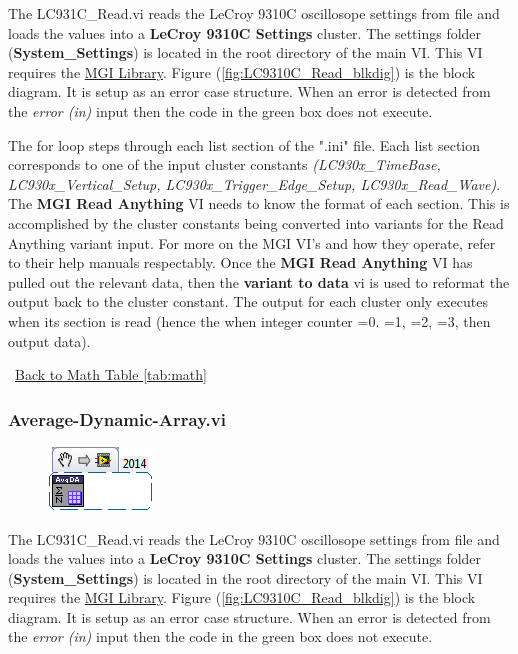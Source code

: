 \documentclass[11pt,a4paper,oldfontcommands]{memoir}
\begin{document}
The LC931C\_Read.vi reads the LeCroy 9310C oscillosope settings from file and loads the values into a \textbf{LeCroy 9310C Settings} cluster. The settings folder (\textbf{System\_Settings}) is located in the root directory of the main VI. This VI requires the \href{http://sine.ni.com/nips/cds/view/p/lang/en/nid/209753}{MGI Library}. Figure (\ref{fig:LC9310C_Read_blkdig}) is the block diagram.  It is setup as an error case structure. When an error is detected from the \textit{error (in)} input then the code in the green box does not execute.

The for loop steps through each list section of the ".ini" file. Each list section corresponds to one of the input cluster constants \textit{(LC930x\_TimeBase, LC930x\_Vertical\_Setup, LC930x\_Trigger\_Edge\_Setup, LC930x\_Read\_Wave)}. The \textbf{MGI Read Anything} VI needs to know the format of each section. This is accomplished by the cluster constants being converted into variants for the Read Anything variant input.  For more on the MGI VI's and how they operate, refer to their help manuals respectably. Once the \textbf{MGI Read Anything} VI has pulled out the relevant data, then the \textbf{variant to data} vi is used to reformat the output back to the cluster constant. The output for each cluster only executes when its section is read (hence the when integer counter =0. =1, =2, =3, then output data).

\noindent\hrulefill\, \hyperref[tab:math]{Back to Math Table \ref{tab:math}}

\subsubsection{Average-Dynamic-Array.vi} \label{Average-Dynamic-Array}
\noindent\hrulefill

\begin{figure}[h]
	\includegraphics[scale=0.625]{Average-Dynamic-Array_main_01}
	\label{fig:Average-Dynamic-Array_main_01}
\end{figure}

The LC931C\_Read.vi reads the LeCroy 9310C oscillosope settings from file and loads the values into a \textbf{LeCroy 9310C Settings} cluster. The settings folder (\textbf{System\_Settings}) is located in the root directory of the main VI. This VI requires the \href{http://sine.ni.com/nips/cds/view/p/lang/en/nid/209753}{MGI Library}. Figure (\ref{fig:LC9310C_Read_blkdig}) is the block diagram.  It is setup as an error case structure. When an error is detected from the \textit{error (in)} input then the code in the green box does not execute.
\end{document}
